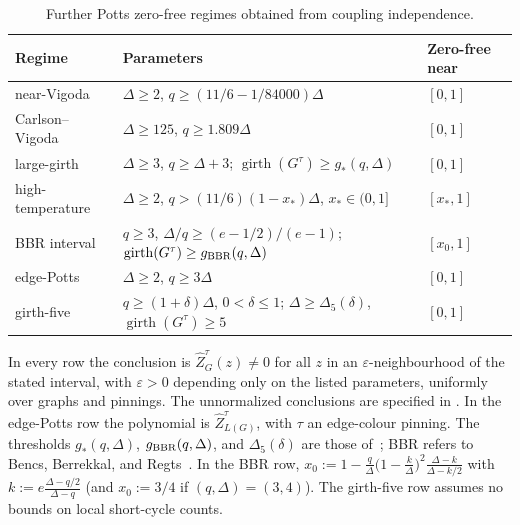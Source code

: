 \documentclass[11pt,reqno]{article}
\theoremstyle{plain}
\theoremstyle{definition}
\theoremstyle{remark}
\theoremstyle{definition}
\theoremstyle{remark}
\newcommand{\eps}{\varepsilon}
\newcommand{\Deg}{\Delta}                        %
\newcommand{\nZpin}[2]{\widehat Z_{#1}^{#2}}
\begin{document}
\begin{table}[tbp]
\centering
\small
\setlength{\tabcolsep}{7pt}
\renewcommand{\arraystretch}{1.22}
\begin{tabular}{@{}lll@{}}
\toprule
Regime & Parameters & Zero-free near \\
\midrule
near-Vigoda
  & \(\Deg\ge2\), \(q\ge(11/6-1/84000)\Deg\)
  & \([0,1]\) \\
Carlson--Vigoda
  & \(\Deg\ge125\), \(q\ge1.809\Deg\)
  & \([0,1]\) \\
large-girth
  & \(\Deg\ge3\), \(q\ge\Deg+3\); \(\operatorname{girth}(G^\tau)\ge g_*(q,\Deg)\)
  & \([0,1]\) \\
high-temperature
  & \(\Deg\ge2\), \(q>(11/6)(1-x_*)\Deg\), \(x_*\in(0,1]\)
  & \([x_*,1]\) \\
BBR interval
  & \(q\ge3\), \(\Deg/q\ge(e-1/2)/(e-1)\); \(\operatorname{girth}(G^\tau)\ge g_{\rm BBR}(q,\Deg)\)
  & \([x_0,1]\) \\
edge-Potts
  & \(\Deg\ge2\), \(q\ge3\Deg\)
  & \([0,1]\) \\
girth-five
  & \(q\ge(1+\delta)\Deg\), \(0<\delta\le1\); \(\Deg\ge\Deg_5(\delta)\), \(\operatorname{girth}(G^\tau)\ge5\)
  & \([0,1]\) \\
\bottomrule
\end{tabular}
\smallskip

\parbox{0.97\textwidth}{\raggedright\footnotesize
In every row the conclusion is \(\nZpin{G}{\tau}(z)\ne0\) for all \(z\)
in an \(\eps\)-neighbourhood of the stated interval, with \(\eps>0\)
depending only on the listed parameters, uniformly over graphs and
pinnings.  The unnormalized conclusions are specified in
.
In the edge-Potts row the polynomial is \(\nZpin{L(G)}{\tau}\), with
\(\tau\) an edge-colour pinning.  The thresholds \(g_*(q,\Deg)\),
\(g_{\rm BBR}(q,\Deg)\), and \(\Deg_5(\delta)\) are those
of~\cite[Theorems~6.1, 7.6, and~9.4]{ShaoShi2026FurtherPotts}; BBR refers
to Bencs, Berrekkal, and Regts~\cite{BencsBerrekkalRegts2025Trees}.  In
the BBR row,
\(x_0:=1-\frac q\Deg\bigl(1-\frac k\Deg\bigr)^{\!2}
\frac{\Deg-k}{\Deg-k/2}\) with \(k:=e\frac{\Deg-q/2}{\Deg-q}\) (and
\(x_0:=3/4\) if \((q,\Deg)=(3,4)\)).  The girth-five row assumes no
bounds on local short-cycle counts.}
\caption{Further Potts zero-free regimes obtained from coupling
independence.}
\label{tab:appendix-extensions}
\end{table}
\end{document}
